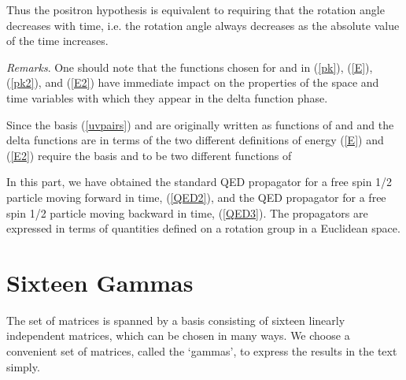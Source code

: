 \documentclass[a4paper,12pt]{article}
\begin{document}
Thus the positron hypothesis is equivalent to requiring that the rotation angle \myHighlight{$\theta$}\coordHE{} decreases with time, i.e. the rotation angle always decreases as the absolute value of the time increases. 

	{\textit{Remarks}}. One should note that the functions chosen for \coordHE{} and \coordHE{} in (\ref{pk}), (\ref{E}), (\ref{pk2}), and (\ref{E2}) have immediate impact on the properties of the space and time variables \coordHE{} with which they appear in the delta function phase.

	Since the \coordHE{} basis (\ref{uvpairs}) and \myHighlight{$\psi$}\coordHE{} are originally written as functions of \coordHE{} and \coordHE{} and the delta functions are in terms of \coordHE{} the two different definitions of energy (\ref{E}) and (\ref{E2}) require the \coordHE{} basis and \myHighlight{$\psi$}\coordHE{} to be two different functions of \coordHE{} 



	In this part, we have obtained the standard QED propagator for a free spin 1/2 particle moving forward in time, (\ref{QED2}), and the QED propagator for a free spin 1/2 particle moving backward in time, (\ref{QED3}). The propagators are expressed in terms of quantities defined on a rotation group in a Euclidean space. 

\appendix

\section{Sixteen Gammas}

	The set of \coordHE{} matrices is spanned by a basis consisting of sixteen linearly independent \coordHE{} matrices, which can be chosen in many ways. We choose a convenient set of matrices, called the `gammas', to express the results in the text simply. \cite{messiah}
\end{document}
